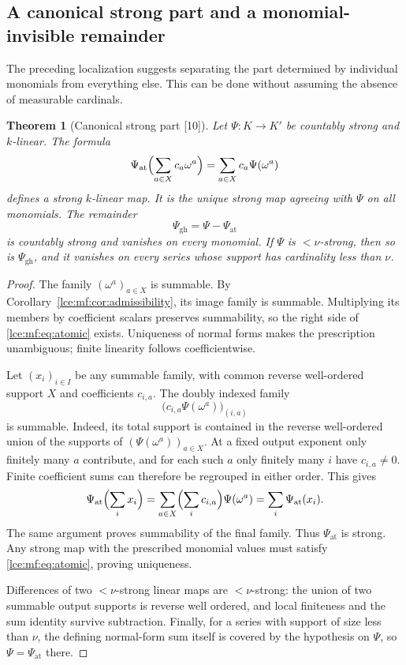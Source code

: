 \documentclass[11pt,letterpaper]{article}
\numberwithin{equation}{section}
\newtheorem{theorem}{Theorem}[section]
\theoremstyle{definition}
\theoremstyle{remark}
\newcommand{\src}[1]{\textup{\textsf{\small[#1]}}}%
\newcommand{\at}{\mathrm{at}}
\newcommand{\gh}{\mathrm{gh}}
\begin{document}
\subsection{A canonical strong part and a monomial-invisible remainder}
The preceding localization suggests separating the part determined by
individual monomials from everything else. This can be done without assuming
the absence of measurable cardinals.

\begin{theorem}[Canonical strong part \src{10}]\label{lce:mf:thm:atomic}
Let $\Psi:K\to K'$ be countably strong and $k$-linear. The formula
\begin{equation}\label{lce:mf:eq:atomic}
 \Psi_{\at}\Bigl(\sum_{a\in X}c_a\omega^a\Bigr)
    =\sum_{a\in X}c_a\Psi(\omega^a)
\end{equation}
defines a strong $k$-linear map. It is the unique strong map agreeing with
$\Psi$ on all monomials. The remainder
\[
 \Psi_{\gh}=\Psi-\Psi_{\at}
\]
is countably strong and vanishes on every monomial. If $\Psi$ is
${<}\nu$-strong, then so is $\Psi_{\gh}$, and it vanishes on every series
whose support has cardinality less than $\nu$.
\end{theorem}
\begin{proof}
The family $(\omega^a)_{a\in X}$ is summable. By
Corollary~\ref{lce:mf:cor:admissibility}, its image family is summable.
Multiplying its members by coefficient scalars preserves summability, so
the right side of \eqref{lce:mf:eq:atomic} exists. Uniqueness of normal
forms makes the prescription unambiguous; finite linearity follows
coefficientwise.

Let $(x_i)_{i\in I}$ be any summable family, with common reverse
well-ordered support $X$ and coefficients $c_{i,a}$. The doubly indexed
family
\[
 \bigl(c_{i,a}\Psi(\omega^a)\bigr)_{(i,a)}
\]
is summable. Indeed, its total support is contained in the reverse
well-ordered union of the supports of $(\Psi(\omega^a))_{a\in X}$. At a
fixed output exponent only finitely many $a$ contribute, and for each such
$a$ only finitely many $i$ have $c_{i,a}\ne0$. Finite coefficient sums can
therefore be regrouped in either order. This gives
\[
 \Psi_{\at}\Bigl(\sum_ix_i\Bigr)
 =\sum_{a\in X}\Bigl(\sum_ic_{i,a}\Bigr)\Psi(\omega^a)
 =\sum_i\Psi_{\at}(x_i).
\]
The same argument proves summability of the final family. Thus
$\Psi_{\at}$ is strong. Any strong map with the prescribed monomial values
must satisfy \eqref{lce:mf:eq:atomic}, proving uniqueness.

Differences of two ${<}\nu$-strong linear maps are ${<}\nu$-strong: the
union of two summable output supports is reverse well ordered, and local
finiteness and the sum identity survive subtraction. Finally, for a series
with support of size less than $\nu$, the defining normal-form sum itself
is covered by the hypothesis on $\Psi$, so $\Psi=\Psi_{\at}$ there.
\end{proof}
\end{document}
